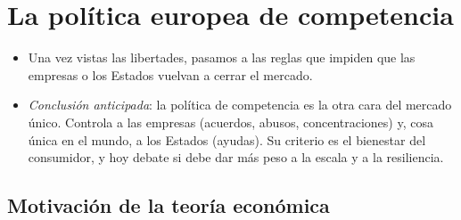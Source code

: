 \documentclass[11pt]{article}
\begin{document}
\begin{infografia}[H]
\centering
\caption{Las 4~libertades de un vistazo: mismo patrón, distinto avance}\label{figu:sintesis-libertades}
\end{infografia}

\section{La política europea de competencia}\label{sec:competencia}

\begin{itemize}
\item Una vez vistas las libertades, pasamos a las reglas que impiden que las empresas o los Estados vuelvan a cerrar el mercado.
\item \emph{Conclusión anticipada}: la política de competencia es la otra cara del mercado único. Controla a las empresas (acuerdos, abusos, concentraciones) y, cosa única en el mundo, a los Estados (ayudas). Su criterio es el bienestar del consumidor, y hoy debate si debe dar más peso a la escala y a la resiliencia.
\end{itemize}

\subsection{Motivación de la teoría económica}\label{sec:motivacion}
\end{document}
